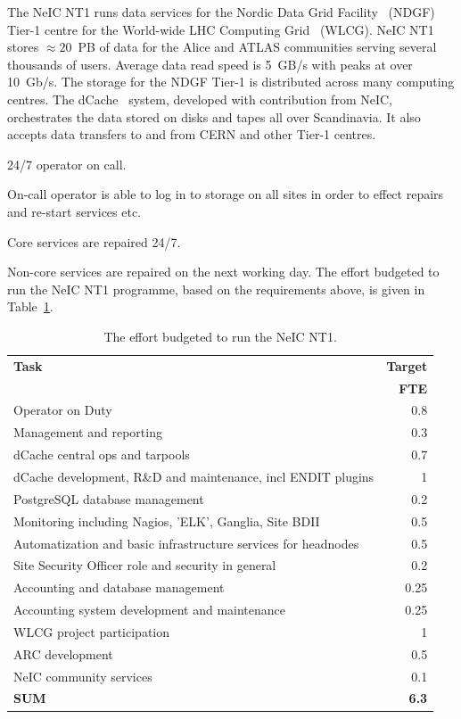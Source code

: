 \documentclass[12pt,a4paper]{article}
\newcommand{\nnt}{NeIC NT1\xspace}
\begin{document}
The \nnt runs data services for the Nordic Data Grid Facility~\cite{ndgf}  (NDGF) Tier-1 centre for the World-wide LHC Computing Grid~\cite{wlcg} (WLCG).
\nnt stores $\approx 20$~PB of data for the Alice and ATLAS communities
serving several thousands of users.
Average data read speed is 5~GB/s with peaks at over 10~Gb/s.
The storage for the NDGF Tier-1 is distributed across many computing centres. 
The dCache~\cite{dcache} system, developed with contribution from NeIC, orchestrates the data stored on disks and tapes all over Scandinavia. 
It also accepts data transfers to and from CERN and other Tier-1 centres.
\bitm
\item 24/7 operator on call.
\item On-call operator is able to log in to storage \einfra on all sites in order to effect repairs and re-start services etc.
\item Core services are repaired 24/7.
\item Non-core services are repaired on the next working day.
\eitm
The effort budgeted to run the \nnt programme, based on the requirements above, is given in Table~\ref{tab:nt1}.
\begin{table}[t] \centering
{}
\begin{tabular}{l|r}
{\bf Task} & 	{\bf Target} \\
 & 	{\bf FTE} \\ \hline
Operator on Duty & 0.8 \\
Management and reporting & 0.3 \\
dCache central ops and tarpools	& 0.7 \\
dCache development, R\&D and maintenance, incl ENDIT plugins & 1 \\
PostgreSQL database management & 0.2 \\
Monitoring including Nagios, 'ELK', Ganglia, Site BDII & 0.5 \\
Automatization and basic infrastructure services for headnodes & 0.5 \\
Site Security Officer role and security in general & 0.2 \\
Accounting and database management & 0.25 \\
Accounting system development and maintenance & 0.25 \\
WLCG project participation & 1 \\
ARC development & 0.5 \\
NeIC community services & 0.1 \\ \hline
{\bf SUM} & {\bf 6.3}
\end{tabular}
\caption{The effort budgeted to run the \nnt. \label{tab:nt1}}
\end{table}
\end{document}
